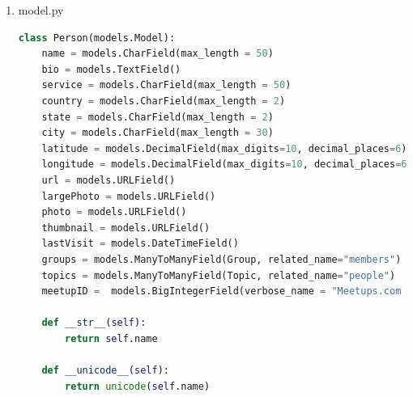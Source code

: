 \documentclass[letterpaper,10pt,onecolumn]{IEEEtran} %
\begin{document}
\begin{enumerate}
\item model.py
\begin{center}
\begin{lstlisting}[language=Python]
class Person(models.Model):
    name = models.CharField(max_length = 50)
    bio = models.TextField()
    service = models.CharField(max_length = 50)
    country = models.CharField(max_length = 2)
    state = models.CharField(max_length = 2)
    city = models.CharField(max_length = 30)
    latitude = models.DecimalField(max_digits=10, decimal_places=6)
    longitude = models.DecimalField(max_digits=10, decimal_places=6)
    url = models.URLField()
    largePhoto = models.URLField()
    photo = models.URLField()
    thumbnail = models.URLField()
    lastVisit = models.DateTimeField()
    groups = models.ManyToManyField(Group, related_name="members")
    topics = models.ManyToManyField(Topic, related_name="people")
    meetupID =  models.BigIntegerField(verbose_name = "Meetups.com ID", unique=True)

    def __str__(self):
        return self.name

    def __unicode__(self):
        return unicode(self.name)
\end{lstlisting}
\end{center}

\end{enumerate}
\end{document}
